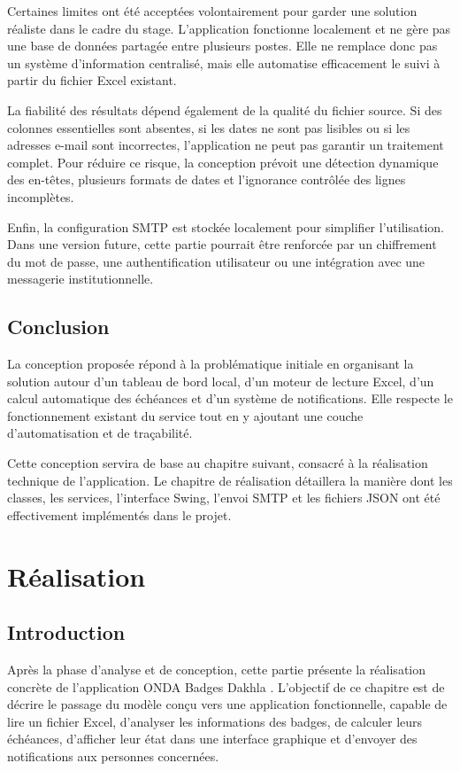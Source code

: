 \documentclass[12pt,a4paper,openany]{report}
\begin{document}
Certaines limites ont été acceptées volontairement pour garder une solution
réaliste dans le cadre du stage. L'application fonctionne localement et ne gère
pas une base de données partagée entre plusieurs postes. Elle ne remplace donc
pas un système d'information centralisé, mais elle automatise efficacement le
suivi à partir du fichier Excel existant.

La fiabilité des résultats dépend également de la qualité du fichier source. Si
des colonnes essentielles sont absentes, si les dates ne sont pas lisibles ou si
les adresses e-mail sont incorrectes, l'application ne peut pas garantir un
traitement complet. Pour réduire ce risque, la conception prévoit une détection
dynamique des en-têtes, plusieurs formats de dates et l'ignorance contrôlée des
lignes incomplètes.

Enfin, la configuration SMTP est stockée localement pour simplifier
l'utilisation. Dans une version future, cette partie pourrait être renforcée par
un chiffrement du mot de passe, une authentification utilisateur ou une
intégration avec une messagerie institutionnelle.

\section{Conclusion}

La conception proposée répond à la problématique initiale en organisant la
solution autour d'un tableau de bord local, d'un moteur de lecture Excel, d'un
calcul automatique des échéances et d'un système de notifications. Elle respecte
le fonctionnement existant du service tout en y ajoutant une couche
d'automatisation et de traçabilité.

Cette conception servira de base au chapitre suivant, consacré à la réalisation
technique de l'application. Le chapitre de réalisation détaillera la manière dont
les classes, les services, l'interface Swing, l'envoi SMTP et les fichiers JSON
ont été effectivement implémentés dans le projet.

\chapter{Réalisation}

\section{Introduction}

Après la phase d'analyse et de conception, cette partie présente la réalisation
concrète de l'application \og ONDA Badges Dakhla \fg{}. L'objectif de ce chapitre
est de décrire le passage du modèle conçu vers une application fonctionnelle,
capable de lire un fichier Excel, d'analyser les informations des badges, de
calculer leurs échéances, d'afficher leur état dans une interface graphique et
d'envoyer des notifications aux personnes concernées.
\end{document}
